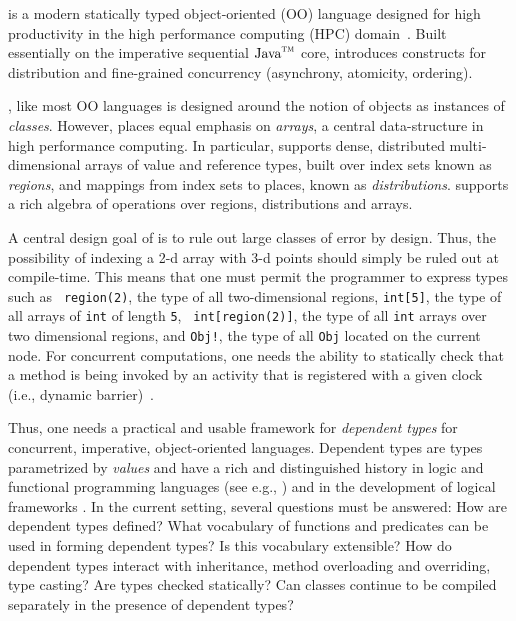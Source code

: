 
%

%
%
%

\Xten{} is a modern statically typed object-oriented (OO) language
designed for high productivity in the high performance computing (HPC)
domain~\cite{X10}. Built essentially on the imperative sequential
$\mbox{Java}^{\mbox{\scriptsize\sc tm}}$ core, \Xten{} introduces constructs for
distribution and fine-grained concurrency (asynchrony, atomicity,
ordering).

\Xten{}, like most OO languages is designed around
the notion of objects as instances of {\em classes}. However, \Xten{}
places equal emphasis on {\em arrays}, a central data-structure in
high performance computing. In particular, \Xten{} supports dense,
distributed multi-dimensional arrays of value and reference types,
built over index sets known as {\em regions}, and mappings from index
sets to places, known as {\em distributions}.  \Xten{} supports a rich
algebra of operations over regions, distributions and arrays.

A central design goal of \Xten{} is to rule out large classes of error
by design. Thus, the possibility of indexing a 2-d array with 3-d
points should simply be ruled out at compile-time. This means that one
must permit the programmer to express types such as {\tt
region(2)}, the type of all two-dimensional regions, {\tt int[5]}, the
type of all arrays of {\tt int} of length {\tt 5}, {\tt
int[region(2)]}, the type of all {\tt int} arrays over two dimensional
regions, and {\tt Obj!}, the type of all {\tt Obj} located on the
current node. For concurrent computations, one needs the ability to
statically check that a method is being invoked by an activity that is
registered with a given clock (i.e., dynamic barrier)~\cite{X10}.

Thus, one needs a practical and usable framework for {\em dependent
types} for concurrent, imperative, object-oriented
languages. Dependent types are types parametrized by {\em values}
\cite{dependent-types}  and have a rich and distinguished history in
logic and functional programming languages (see e.g.,
\cite{xi99dependent,ocrz-ecoop03,aspinall-attapl,cayenne,epigram-matter})
and in the development of logical frameworks
\cite{calc-constructions}.  In the current setting, several questions
must be answered: How are dependent types defined? What vocabulary of
functions and predicates can be used in forming dependent types? Is
this vocabulary extensible?  How do dependent types interact with
inheritance, method overloading and overriding, type casting? Are
types checked statically? Can classes continue to be compiled separately in the presence of dependent types?

